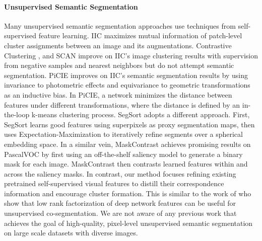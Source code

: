 \documentclass{article} \usepackage{iclr2022_conference,times}
\begin{document}
\paragraph{Unsupervised Semantic Segmentation}
Many unsupervised semantic segmentation approaches use techniques from self-supervised feature learning. IIC \citep{iic} maximizes mutual information of patch-level cluster assignments between an image and its augmentations. Contrastive Clustering \citep{contrastive-clustering}, and SCAN \citep{scan} improve on IIC's image clustering results with supervision from negative samples and nearest neighbors but do not attempt semantic segmentation. PiCIE \citep{Cho2021PiCIEUS} improves on IIC's semantic segmentation results by using invariance to photometric effects and equivariance to geometric transformations as an inductive bias. In PiCIE, a network minimizes the distance between features under different transformations, where the distance is defined by an in-the-loop k-means clustering process. SegSort \citep{segsort} adopts a different approach. First, SegSort learns good features using superpixels as proxy segmentation maps, then uses Expectation-Maximization to iteratively refine segments over a spherical embedding space. In a similar vein, MaskContrast \citep{maskcontrast} achieves promising results on PascalVOC by first using an off-the-shelf saliency model to generate a binary mask for each image. MaskContrast then contrasts learned features within and across the saliency masks. In contrast, our method focuses refining existing pretrained self-supervised visual features to distill their correspondence information and encourage cluster formation. This is similar to the work of \cite{collins2018deep} who show that low rank factorization of deep network features can be useful for unsupervised co-segmentation. We are not aware of any previous work that achieves the goal of high-quality, pixel-level unsupervised semantic segmentation on large scale datasets with diverse images.
\end{document}
